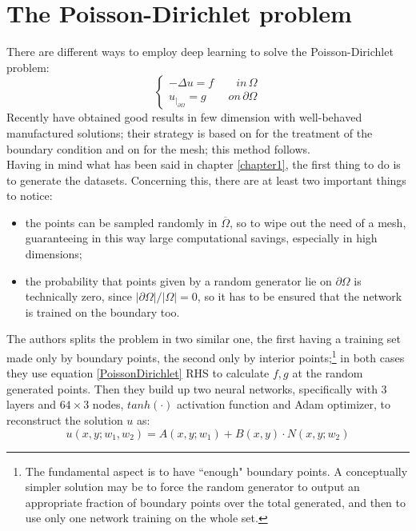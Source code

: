 \documentclass[12pt, a4paper]{report}
\theoremstyle{definition}
\begin{document}
\section{The Poisson-Dirichlet problem}\label{section2.1}
There are different ways to employ deep learning to solve the Poisson-Dirichlet problem:
\begin{equation}\label{PoissonDirichlet}
\begin{cases}
-\Delta u = f \quad\quad in\, \Omega\\
u_{|_{\partial\Omega}}=g\qquad on\, \partial\Omega 
\end{cases}
\end{equation}
Recently \cite{Kailai} have obtained good results in few dimension with well-behaved manufactured solutions; their strategy is based on \cite{Lagaris} for the treatment of the boundary condition and on \cite{Sirignano} for the mesh; this method follows.\\
Having in mind what has been said in chapter \ref{chapter1}, the first thing to do is to generate the datasets. Concerning this, there are at least two important things to notice: 
\begin{itemize}
	\item the points can be sampled randomly in $\overline{\Omega}$, so to wipe out the need of a mesh, guaranteeing in this way large computational savings, especially in high dimensions;
	\item the probability that points given by a random generator lie on $\partial \Omega$ is technically zero, since $|\partial\Omega|/|\Omega|=0$, so it has to be ensured that the network is trained on the boundary too.
\end{itemize}
\noindent The authors splits the problem in two similar one, the first having a training set made only by boundary points, the second only by interior points;\footnote{The fundamental aspect is to have ``enough" boundary points. A conceptually simpler solution may be to force the random generator to output an appropriate fraction of boundary points over the total generated, and then to use only one network training on the whole set.} in both cases they use equation \eqref{PoissonDirichlet} RHS to calculate $f,g$ at the random generated points. Then they build up two neural networks, specifically with $3$ layers and $64\times 3$ nodes, $tanh(\cdot)$ activation function and Adam optimizer, to reconstruct the solution $u$ as:
\begin{equation}\label{sol_kailai}
u(x,y;w_1,w_2)=A(x,y;w_1)+B(x,y)\cdot N(x,y;w_2)
\end{equation}
\end{document}

